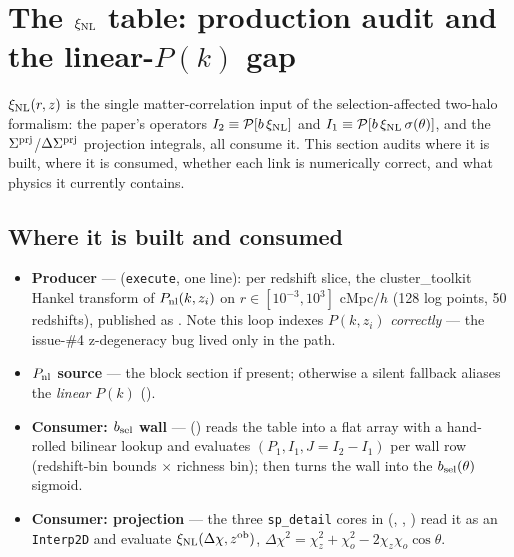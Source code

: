 \section{The $\xi_{\rm NL}$ table: production audit and the linear-$P(k)$ gap}
\label{sec:xinl}

$\xi_{\rm NL}(r, z)$ is the single matter-correlation input of the
selection-affected two-halo formalism: the paper's operators
$I_2 \equiv \mathcal{P}[b\,\xi_{\rm NL}]$ and
$I_1 \equiv \mathcal{P}[b\,\xi_{\rm NL}\,\sigma(\theta)]$, and the
$\Sigma^{\rm prj}$/$\Delta\Sigma^{\rm prj}$ projection integrals, all
consume it. This section audits where it is built, where it is
consumed, whether each link is numerically correct, and what physics it
currently contains.

\subsection{Where it is built and consumed}

\begin{itemize}
\item \textbf{Producer} ---
   (\texttt{execute}, one line): per
  redshift slice, the cluster\_toolkit Hankel transform of
  $P_{\rm nl}(k, z_i)$ on $r \in [10^{-3}, 10^{3}]$ cMpc$/h$ (128 log
  points, 50 redshifts), published as . Note this loop
  indexes $P(k, z_i)$ \emph{correctly} --- the issue-\#4 z-degeneracy
  bug lived only in the  path.
\item \textbf{$P_{\rm nl}$ source} --- the block section
   if present; otherwise a silent fallback
  aliases the \emph{linear} $P(k)$
  ().
\item \textbf{Consumer: $b_{\rm sel}$ wall} ---
   () reads the
  table into a flat array with a hand-rolled bilinear lookup and
  evaluates $(P_1, I_1, J{=}I_2{-}I_1)$ per wall row
  (redshift-bin bounds $\times$ richness bin);
   then turns the wall into the $b_{\rm sel}(\theta)$
  sigmoid.
\item \textbf{Consumer: projection} --- the three \texttt{sp\_detail}
  cores in  (,
  , ) read
  it as an \texttt{Interp2D} and evaluate $\xi_{\rm NL}(\Delta\chi, z^{\rm ob})$,
  $\Delta\chi^2 = \chi_z^2 + \chi_o^2 - 2\chi_z\chi_o\cos\theta$.
\end{itemize}

